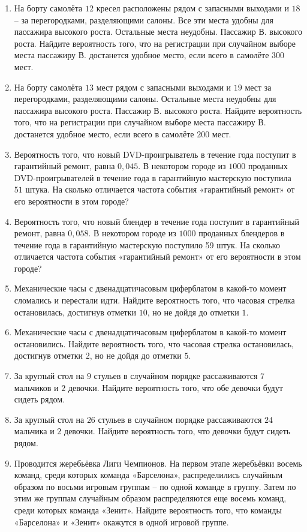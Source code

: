 \documentclass[12pt, a4paper]{article}
\begin{document}
\begin{enumerate}
		\item На борту самолёта \( 12 \) кресел расположены рядом с запасными выходами и \( 18 \) – за перегородками, разделяющими салоны. Все эти места удобны для пассажира высокого роста. Остальные места неудобны. Пассажир В. высокого роста. Найдите вероятность того, что на регистрации при случайном выборе места пассажиру В. достанется удобное место, если всего в самолёте \( 300 \) мест.
		\item На борту самолёта \( 13 \) мест рядом с запасными выходами и \( 19 \) мест за перегородками, разделяющими салоны. Остальные места неудобны для пассажира высокого роста. Пассажир В. высокого роста. Найдите вероятность того, что на регистрации при случайном выборе места пассажиру В. достанется удобное место, если всего в самолёте \( 200 \) мест.
		\item Вероятность того, что новый DVD-проигрыватель в течение года поступит в гарантийный ремонт, равна \( 0,045 \). В некотором городе из \( 1000 \) проданных DVD-проигрывателей в течение года в гарантийную мастерскую поступила \( 51 \) штука. На сколько отличается частота события «гарантийный ремонт» от его вероятности в этом городе?
		\item Вероятность того, что новый блендер в течение года поступит в гарантийный ремонт, равна \( 0,058 \). В некотором городе из \( 1000 \) проданных блендеров в течение года в гарантийную мастерскую поступило 59 штук. На сколько отличается частота события «гарантийный ремонт» от его вероятности в этом городе?
		\item Механические часы с двенадцатичасовым циферблатом в какой-то момент сломались и перестали идти. Найдите вероятность того, что часовая стрелка остановилась, достигнув отметки \( 10 \), но не дойдя до отметки \( 1 \).
		\item Механические часы с двенадцатичасовым циферблатом в какой-то момент остановились. Найдите вероятность того, что часовая стрелка остановилась, достигнув отметки \( 2 \), но не дойдя до отметки \( 5 \).
		\item За круглый стол на \( 9 \) стульев в случайном порядке рассаживаются \( 7 \) мальчиков и \( 2 \) девочки. Найдите вероятность того, что обе девочки будут сидеть рядом.
		\item За круглый стол на \( 26 \) стульев в случайном порядке рассаживаются \( 24 \) мальчика и \( 2 \) девочки. Найдите вероятность того, что девочки будут сидеть рядом.
		\item Проводится жеребьёвка Лиги Чемпионов. На первом этапе жеребьёвки восемь команд, среди которых команда «Барселона», распределились случайным образом по восьми игровым группам – по одной команде в группу. Затем по этим же группам случайным образом распределяются еще восемь команд, среди которых команда «Зенит». Найдите вероятность того, что команды «Барселона» и «Зенит» окажутся в одной игровой группе.

\end{enumerate}
\end{document}
